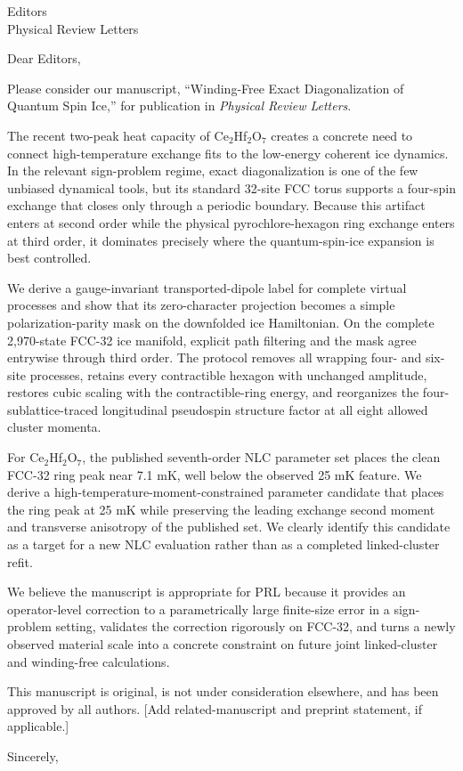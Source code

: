 \documentclass[10pt]{letter}
\begin{document}
\begin{letter}{Editors\\Physical Review Letters}
\opening{Dear Editors,}

Please consider our manuscript, ``Winding-Free Exact Diagonalization of
Quantum Spin Ice,'' for publication in \emph{Physical Review Letters}.

The recent two-peak heat capacity of Ce$_2$Hf$_2$O$_7$ creates a concrete
need to connect high-temperature exchange fits to the low-energy coherent
ice dynamics. In the relevant sign-problem regime, exact diagonalization is
one of the few unbiased dynamical tools, but its standard 32-site FCC torus
supports a four-spin exchange that closes only through a periodic boundary.
Because this artifact enters at second order while the physical
pyrochlore-hexagon ring exchange enters at third order, it dominates
precisely where the quantum-spin-ice expansion is best controlled.

We derive a gauge-invariant transported-dipole label for complete virtual
processes and show that its zero-character projection becomes a simple
polarization-parity mask on the downfolded ice Hamiltonian. On the complete
2,970-state FCC-32 ice manifold, explicit path filtering and the mask agree
entrywise through third order. The protocol removes all wrapping four- and
six-site processes, retains every contractible hexagon with unchanged
amplitude, restores cubic scaling with the contractible-ring energy, and
reorganizes the four-sublattice-traced longitudinal pseudospin structure
factor at all eight allowed cluster momenta.

For Ce$_2$Hf$_2$O$_7$, the published seventh-order NLC parameter set places
the clean FCC-32 ring peak near 7.1 mK, well below the observed 25 mK
feature. We derive a high-temperature-moment-constrained parameter candidate
that places the ring peak at 25 mK while preserving the leading exchange
second moment and transverse anisotropy of the published set. We clearly
identify this candidate as a target for a new NLC evaluation rather than as
a completed linked-cluster refit.

We believe the manuscript is appropriate for PRL because it provides an
operator-level correction to a parametrically large finite-size error in a
sign-problem setting, validates the correction rigorously on FCC-32, and
turns a newly observed material scale into a concrete constraint on future
joint linked-cluster and winding-free calculations.

This manuscript is original, is not under consideration elsewhere, and has
been approved by all authors. [Add related-manuscript and preprint statement,
if applicable.]

\closing{Sincerely,}
\end{letter}
\end{document}
